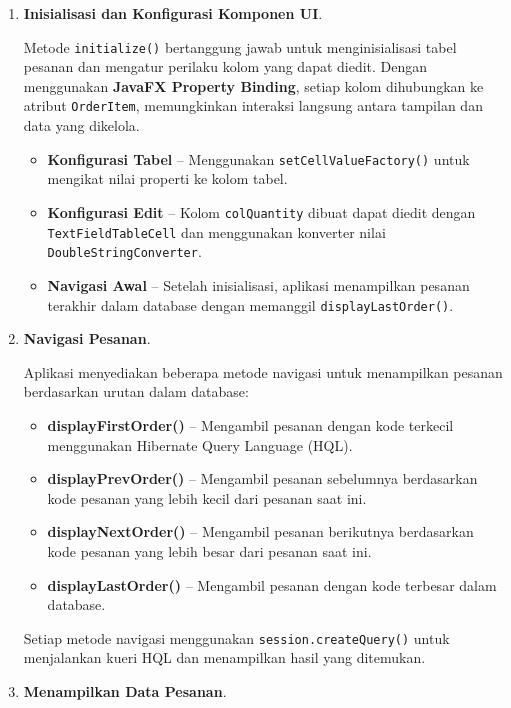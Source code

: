 \begin{enumerate}
	\item \textbf{Inisialisasi dan Konfigurasi Komponen UI}.
	
	Metode \texttt{initialize()} bertanggung jawab untuk menginisialisasi tabel pesanan dan mengatur perilaku kolom yang dapat diedit. Dengan menggunakan \textbf{JavaFX Property Binding}, setiap kolom dihubungkan ke atribut \texttt{OrderItem}, memungkinkan interaksi langsung antara tampilan dan data yang dikelola.
	
	\begin{itemize}
		\item \textbf{Konfigurasi Tabel} – Menggunakan \texttt{setCellValueFactory()} untuk mengikat nilai properti ke kolom tabel.
		\item \textbf{Konfigurasi Edit} – Kolom \texttt{colQuantity} dibuat dapat diedit dengan \texttt{TextFieldTableCell} dan menggunakan konverter nilai \texttt{DoubleStringConverter}.
		\item \textbf{Navigasi Awal} – Setelah inisialisasi, aplikasi menampilkan pesanan terakhir dalam database dengan memanggil \texttt{displayLastOrder()}.
	\end{itemize}
	
	\item \textbf{Navigasi Pesanan}.
	
	Aplikasi menyediakan beberapa metode navigasi untuk menampilkan pesanan berdasarkan urutan dalam database:
	
	\begin{itemize}
		\item \textbf{displayFirstOrder()} – Mengambil pesanan dengan kode terkecil menggunakan Hibernate Query Language (HQL).
		\item \textbf{displayPrevOrder()} – Mengambil pesanan sebelumnya berdasarkan kode pesanan yang lebih kecil dari pesanan saat ini.
		\item \textbf{displayNextOrder()} – Mengambil pesanan berikutnya berdasarkan kode pesanan yang lebih besar dari pesanan saat ini.
		\item \textbf{displayLastOrder()} – Mengambil pesanan dengan kode terbesar dalam database.
	\end{itemize}
	
	Setiap metode navigasi menggunakan \texttt{session.createQuery()} untuk menjalankan kueri HQL dan menampilkan hasil yang ditemukan.
	
	\item \textbf{Menampilkan Data Pesanan}.
	

\end{enumerate}

